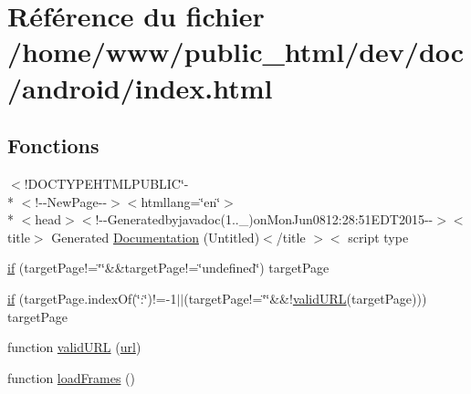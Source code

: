 \hypertarget{index_8html}{\section{Référence du fichier /home/www/public\-\_\-html/dev/doc/android/index.html}
\label{index_8html}
}
\subsection*{Fonctions}
\begin{DoxyCompactItemize}
\item 
$<$!D\-O\-C\-T\-Y\-P\-E\-H\-T\-M\-L\-P\-U\-B\-L\-I\-C\char`\"{}-\/\\*
$<$!-\/-\/New\-Page-\/-\/$>$$<$htmllang=\char`\"{}en\char`\"{}$>$\\*
$<$head$>$$<$!-\/-\/Generatedbyjavadoc(1..\-\_)on\-Mon\-Jun0812\-:28\-:51\-E\-D\-T2015-\/-\/$>$$<$title$>$ Generated \hyperlink{index_8html_af9ffe55f49ba62a82c9250c523853ed6}{Documentation} (Untitled)$<$/title $>$$<$ script type
\item 
\hyperlink{index_8html_a5e93495b448b5c411f2ad8f8f0645e81}{if} (target\-Page!=\char`\"{}\char`\"{}\&\&target\-Page!=\char`\"{}undefined\char`\"{}) target\-Page
\item 
\hyperlink{index_8html_ac3319c4d3988ba4dde95186b368963f2}{if} (target\-Page.\-index\-Of(\char`\"{}\-:\char`\"{})!=-\/1$|$$|$(target\-Page!=\char`\"{}\char`\"{}\&\&!\hyperlink{index_8html_a4c98bf95335bf71bea7b757f4f339b4b}{valid\-U\-R\-L}(target\-Page))) target\-Page
\item 
function \hyperlink{index_8html_a4c98bf95335bf71bea7b757f4f339b4b}{valid\-U\-R\-L} (\hyperlink{stylesheet_8css_a415fa7808e24d8066483ae0874bd9089}{url})
\item 
function \hyperlink{index_8html_a88446761c9415c5151a8e306e0e8cca9}{load\-Frames} ()
\end{DoxyCompactItemize}



